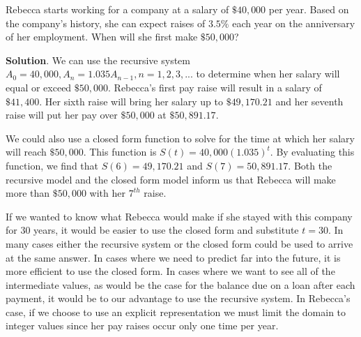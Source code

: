 \documentclass[10pt,]{book}
\theoremstyle{ptxdefinitionnotitle}
\theoremstyle{ptxdefinitiontitle}
\theoremstyle{ptxdefinitionnotitle}
\theoremstyle{ptxdefinitiontitle}
\theoremstyle{ptxdefinitionnotitle}
\theoremstyle{ptxdefinitiontitle}
\numberwithin{equation}{section}
\begin{document}
\begin{example}\label{example-recursive-salary}
\hypertarget{p-111}{}%
Rebecca starts working for a company at a salary of \(\$40,000\) per year. Based on the company's history, she can expect raises of \(3.5\%\) each year on the anniversary of her employment. When will she first make \(\$50,000\)?%
\par\smallskip%
\noindent\textbf{Solution}.\hypertarget{solution-9}{}\quad%
\hypertarget{p-112}{}%
We can use the recursive system \(A_0=40,000, A_n=1.035A_{n-1}, n=1,2,3,...\) to determine when her salary will equal or exceed \(\$50,000\).  Rebecca’s first pay raise will result in a salary of \(\$41,400\).  Her sixth raise will bring her salary up to \(\$49,170.21\) and her seventh raise will put her pay over \(\$50,000\) at \(\$50,891.17\).%
\par
\hypertarget{p-113}{}%
We could also use a closed form function to solve for the time at which her salary will reach \(\$50,000\).  This function is \(S(t)=40,000(1.035)^t\). By evaluating this function, we find that \(S(6)=49,170.21\) and \(S(7)=50,891.17\). Both the recursive model and the closed form model inform us that Rebecca will make more than \(\$50,000\) with her \(7^{th}\) raise.%
\par
\hypertarget{p-114}{}%
If we wanted to know what Rebecca would make if she stayed with this company for \(30\) years, it would be easier to use the closed form and substitute \(t=30\).  In many cases either the recursive system or the closed form could be used to arrive at the same answer. In cases where we need to predict far into the future, it is more efficient to use the closed form. In cases where we want to see all of the intermediate values, as would be the case for the balance due on a loan after each payment, it would be to our advantage to use the recursive system. In Rebecca's case, if we choose to use an explicit representation we must limit the domain to integer values since her pay raises occur only one time per year.%
\end{example}
\end{document}
